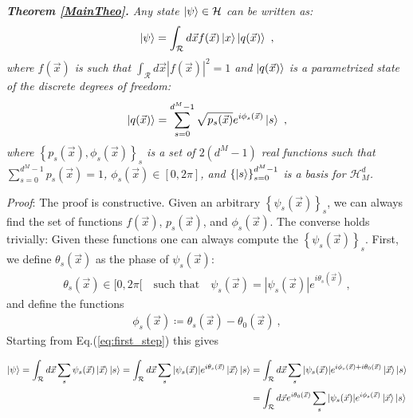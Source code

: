 \documentclass[draft,nofootinbib,pre,twocolumn,showpacs,showkeys,preprintnumbers,floatfix]{revtex4-1}
\newcommand{\1}{\mathbbm{1}}
\begin{document}
\emph{{\bf Theorem \ref{MainTheo}.}
Any state $\ket{\psi} \in \mathcal{H}$ can be written as:
\begin{align*}
\ket{\psi} = \int_{\mathcal{R}}d\vec{x} f(\vec{x}) \ket{x}\ket{q(\vec{x})}
  ~,
\end{align*}
where $f(\vec{x})$ is such that $\int_{\mathcal{R}}d\vec{x} |f(\vec{x})|^2 = 1$
and $\ket{q(\vec{x})}$ is a parametrized state of the discrete degrees of
freedom:
\begin{align*}
\ket{q(\vec{x})}
  = \sum_{s=0}^{d^M-1} \sqrt{p_s(\vec{x})} e^{i\phi_s(\vec{x})} \ket{s}
  ~,
\end{align*}
where $\left\{ p_s(\vec{x}),\phi_s(\vec{x})\right\}_s$ is a set of $2(d^M-1)$
real functions such that $\sum_{s=0}^{d^M-1} p_s(\vec{x}) = 1$,
$\phi_s(\vec{x}) \in [0,2\pi]$, and $\left\{\ket{s}\right\}_{s=0}^{d^M-1}$ is a
basis for $\mathcal{H}_M^d$.
}

\emph{Proof}: The proof is constructive. Given an arbitrary
$\left\{ \psi_s(\vec{x}) \right\}_s$, we can always find the set of functions
$f(\vec{x})$, $p_s(\vec{x})$, and $\phi_s(\vec{x})$. The converse holds
trivially: Given these functions one can always compute the $\left\{
\psi_s(\vec{x}) \right\}_s$. First, we define $\theta_s(\vec{x})$ as
the phase of $\psi_s(\vec{x})$:
\begin{align*}
\theta_s(\vec{x}) \in [0,2\pi[ \quad \mathrm{such \,\, that} \quad \psi_s(\vec{x}) = |\psi_s(\vec{x})| e^{i\theta_s(\vec{x})} 
  ~,
\end{align*}
and define the functions
\begin{align*}
\phi_s(\vec{x}) \coloneqq \theta_s(\vec{x}) - \theta_0(\vec{x})
  ~,
\end{align*}
Starting from Eq.(\ref{eq:first_step}) this gives

\begin{align*}
\ket{\psi} = \int_{\mathcal{R}} d\vec{x} \sum_{s} \psi_s(\vec{x})\ket{\vec{x}} \ket{s} = \int_{\mathcal{R}} d\vec{x} \sum_{s} \vert \psi_s(\vec{x}) \vert e^{i\theta_s(\vec{x})}\ket{\vec{x}} \ket{s} & =  \int_{\mathcal{R}} d\vec{x} \sum_{s} \vert \psi_s(\vec{x}) \vert e^{i\phi_s(\vec{x})+i\theta_0(\vec{x})}\ket{\vec{x}} \ket{s} \\ & = \int_{\mathcal{R}} d\vec{x} e^{i\theta_0(\vec{x})}\sum_{s} \vert \psi_s(\vec{x}) \vert e^{i\phi_s(\vec{x})}\ket{\vec{x}} \ket{s}
\end{align*}
\end{document}
